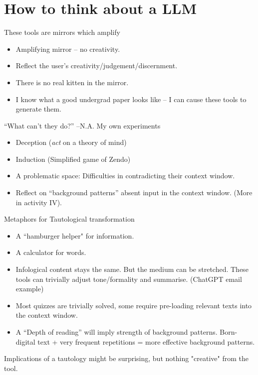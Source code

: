 \documentclass[aspectratio=169]{beamer}
\begin{document}
\section{How to think about a LLM}
\begin{frame}{These tools are mirrors which amplify}


\begin{itemize}
    \item Amplifying mirror -- no creativity.
    \item Reflect the user's creativity/judgement/discernment.
    \item There is no real kitten in the mirror.
    \item I know what a good undergrad paper looks like -- I can cause these tools to generate them.
\end{itemize}

     
\end{frame}
\begin{frame}{``What can't they do?'' --N.A.}
My own experiments
  \begin{itemize}
      \item Deception (\textit{act} on a theory of mind)
      \item Induction (Simplified game of Zendo)
      \item A problematic space: Difficulties in contradicting their context window.
      \item Reflect on ``background patterns'' absent input in the context window. (More in activity IV). 
  \end{itemize}


\end{frame}
\begin{frame}{Metaphors for Tautological transformation}
\begin{itemize}
    \item A ``hamburger helper" for information. 
    \item A calculator for words. \parencite{Willison2023-nf}
    \item Infological content stays the same. But the medium can be stretched. These tools can trivially adjust tone/formality and summarise. (ChatGPT email example)
    \item Most quizzes are trivially solved, some require pre-loading relevant texts into the context window.
    \item A ``Depth of reading'' will imply strength of background patterns. Born-digital text + very frequent repetitions = more effective background patterns.
\end{itemize}

\vspace{1em}

{\Large Implications of a tautology might be surprising, but nothing "creative" from the tool.}
    
\end{frame}
\end{document}
